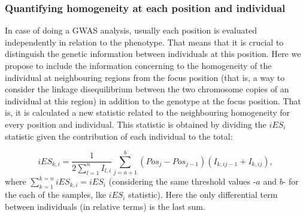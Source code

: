 \documentclass[a4paper,11pt]{article}
\begin{document}
\subsubsection{Quantifying homogeneity at each position and individual}
In case of doing a GWAS analysis, usually each position is evaluated independently in relation to the phenotype. That means that it is crucial to distinguish the genetic information between individuals at this position. Here we propose to include the information concerning to the homogeneity of the individual at neighbouring regions from the focus position (that is, a way to consider the linkage disequilibrium between the two chromosome copies of an individual at this region) in addition to the genotype at the focus position. That is, it is calculated a new statistic related to the neighbouring homogeneity for every position and individual. This statistic is obtained by dividing the $iES_i$ statistic given the contribution of each individual to the total:

 \begin{equation}
 iES_{k,i} = \frac{1}{2\sum_{l=1}^{n}I_{l,i}} \sum_{j=a+1}^{b} (Pos_{j} - Pos_{j-1}) (I_{k,ij-1} + I_{k,ij}),
 \end{equation}
where $\sum_{k=1}^{k=n}iES_{k,i}=iES_i$ (considering the same threshold values -$a$ and $b$- for the each of the samples, lke $iES_i$ statistic). Here the only differential term between individuals (in relative terms) is the last sum. %


\end{document}
